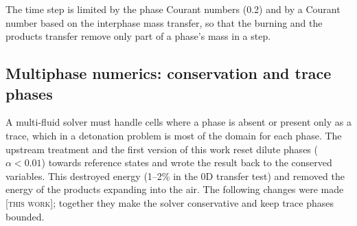 \documentclass{article}
\newcommand{\tw}{\textsc{[this work]}}
\begin{document}
The time step is limited by the phase Courant numbers (0.2) and by a Courant number based on the interphase mass transfer, so that the burning and the products transfer remove only part of a phase's mass in a step.

\subsection{Multiphase numerics: conservation and trace phases}
\label{sec:multiphase_numerics}

A multi-fluid solver must handle cells where a phase is absent or present only as a trace, which in a detonation problem is most of the domain for each phase. The upstream treatment and the first version of this work reset dilute phases ($\alpha < 0.01$) towards reference states and wrote the result back to the conserved variables. This destroyed energy (1--2\% in the 0D transfer test) and removed the energy of the products expanding into the air. The following changes were made \tw; together they make the solver conservative and keep trace phases bounded.
\end{document}
